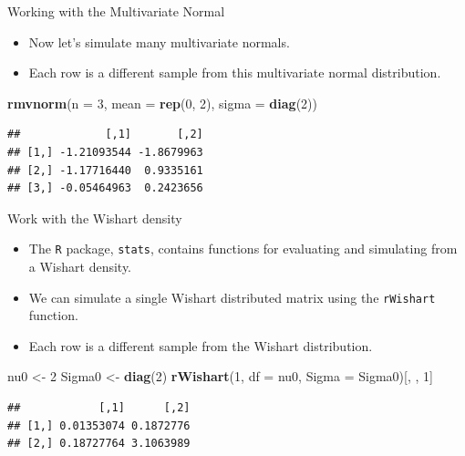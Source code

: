 \documentclass[
  ignorenonframetext,
]{beamer}
\newenvironment{Shaded}{\begin{snugshade}}{\end{snugshade}}
\newcommand{\DataTypeTok}[1]{\textcolor[rgb]{0.13,0.29,0.53}{#1}}
\newcommand{\DecValTok}[1]{\textcolor[rgb]{0.00,0.00,0.81}{#1}}
\newcommand{\KeywordTok}[1]{\textcolor[rgb]{0.13,0.29,0.53}{\textbf{#1}}}
\newcommand{\NormalTok}[1]{#1}
\newcommand{\StringTok}[1]{\textcolor[rgb]{0.31,0.60,0.02}{#1}}
\providecommand{\tightlist}{%
  \setlength{\itemsep}{0pt}\setlength{\parskip}{0pt}}
\begin{document}
\begin{frame}[fragile]{Working with the Multivariate Normal}
\protect\hypertarget{working-with-the-multivariate-normal}{}

\begin{itemize}
\tightlist
\item
  Now let's simulate many multivariate normals.
\item
  Each row is a different sample from this multivariate normal
  distribution.
\end{itemize}

\begin{Shaded}
\begin{Highlighting}[]
\KeywordTok{rmvnorm}\NormalTok{(}\DataTypeTok{n =} \DecValTok{3}\NormalTok{, }\DataTypeTok{mean =} \KeywordTok{rep}\NormalTok{(}\DecValTok{0}\NormalTok{, }\DecValTok{2}\NormalTok{), }\DataTypeTok{sigma =} \KeywordTok{diag}\NormalTok{(}\DecValTok{2}\NormalTok{))}
\end{Highlighting}
\end{Shaded}

\begin{verbatim}
##             [,1]       [,2]
## [1,] -1.21093544 -1.8679963
## [2,] -1.17716440  0.9335161
## [3,] -0.05464963  0.2423656
\end{verbatim}

\end{frame}

\begin{frame}[fragile]{Work with the Wishart density}
\protect\hypertarget{work-with-the-wishart-density}{}

\begin{itemize}
\item
  The \texttt{R} package, \texttt{stats}, contains functions for
  evaluating and simulating from a Wishart density.
\item
  We can simulate a single Wishart distributed matrix using the
  \texttt{rWishart} function.
\item
  Each row is a different sample from the Wishart distribution.
\end{itemize}

\begin{Shaded}
\begin{Highlighting}[]
\NormalTok{nu0 <-}\StringTok{ }\DecValTok{2}
\NormalTok{Sigma0 <-}\StringTok{ }\KeywordTok{diag}\NormalTok{(}\DecValTok{2}\NormalTok{)}
\KeywordTok{rWishart}\NormalTok{(}\DecValTok{1}\NormalTok{, }\DataTypeTok{df =}\NormalTok{ nu0, }\DataTypeTok{Sigma =}\NormalTok{ Sigma0)[, , }\DecValTok{1}\NormalTok{]}
\end{Highlighting}
\end{Shaded}

\begin{verbatim}
##            [,1]      [,2]
## [1,] 0.01353074 0.1872776
## [2,] 0.18727764 3.1063989
\end{verbatim}

\end{frame}
\end{document}
